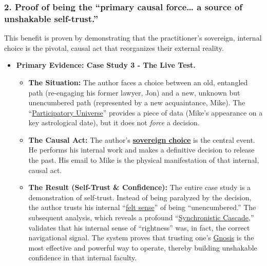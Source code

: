 \documentclass{article}
\begin{document}
\subsubsection*{2. Proof of being the ``primary causal force\ldots{} a source of unshakable self-trust.''}\label{proof-of-being-the-primary-causal-force-a-source-of-unshakable-self-trust.}

This benefit is proven by demonstrating that the practitioner's sovereign, internal choice is the pivotal, causal act that reorganizes their external reality.

\begin{itemize}
\item
  \textbf{Primary Evidence: Case Study 3 - The Live Test.}

  \begin{itemize}
  \item
    \textbf{The Situation:} The author faces a choice between an old, entangled path (re-engaging his former lawyer, Jon) and a new, unknown but unencumbered path (represented by a new acquaintance, Mike). The ``\hyperlink{gloss:participatory_universe}{Participatory Universe}'' provides a piece of data (Mike's appearance on a key astrological date), but it does not \emph{force} a decision.
  \item
    \textbf{The Causal Act:} The author's \textbf{\hyperlink{gloss:sovereign_choice}{sovereign choice}} is the central event. He performs his internal work and makes a definitive decision to release the past. His email to Mike is the physical manifestation of that internal, causal act.
  \item
    \textbf{The Result (Self-Trust \& Confidence):} The entire case study is a demonstration of self-trust. Instead of being paralyzed by the decision, the author trusts his internal ``\hyperlink{gloss:felt_sense}{felt sense}'' of being ``unencumbered.'' The subsequent analysis, which reveals a profound ``\hyperlink{gloss:synchronistic_cascade}{Synchronistic Cascade},'' validates that his internal sense of ``rightness'' was, in fact, the correct navigational signal. The system proves that trusting one's \hyperlink{gloss:gnosis}{Gnosis} is the most effective and powerful way to operate, thereby building unshakable confidence in that internal faculty.
  \end{itemize}
\end{itemize}
\end{document}
